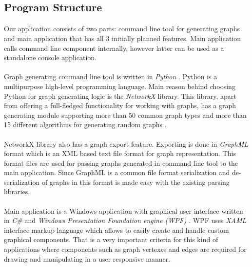 \documentclass[a4paper,TexShade]{class}
\begin{document}
\bigskip
\subsection{Program Structure} \label{program-structure}

\paragraph{} Our application consists of two parts: command line tool for generating graphs and main application that has all 3 initially planned features. Main application calls command line component internally, however latter can be used as a standalone console application.

\paragraph{} Graph generating command line tool is written in \textit{Python} \cite{python}. Python is a multipurpose high-level programming language. Main reason behind choosing Python for graph generating logic is the \textit{NetworkX} \cite{networkx} library. This library, apart from offering a full-fledged functionality for working with graphs, has a graph generating module supporting more than 50 common graph types and more than 15 different algorithms for generating random graphs \cite{networkx-generators}.

\paragraph{} NetworkX library also has a graph export feature. Exporting is done in \textit{GraphML} format \cite{graphml} which is an XML based text file format for graph representation. This format files are used for passing graphs generated in command line tool to the main application. Since GraphML is a common file format serialization and de-serialization of graphs in this format is made easy with the existing parsing libraries.

\paragraph{} Main application is a Windows application with graphical user interface written in \textit{C\#} \cite{c-sharp} and \textit{Windows Presentation Foundation engine (WPF)} \cite{wpf}. WPF uses \textit{XAML} \cite{xaml} interface markup language which allows to easily create and handle custom graphical components. That is a very important criteria for this kind of applications where components such as graph vertexes and edges are required for drawing and manipulating in a user responsive manner.
\end{document}
